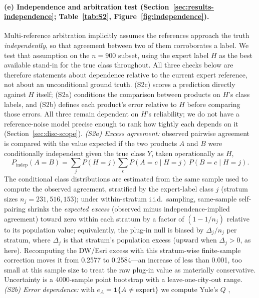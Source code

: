 \documentclass[remotesensing,article,submit,moreauthors]{Definitions/mdpi}
\begin{document}
\paragraph{(e) Independence and arbitration test (Section~\ref{sec:results-independence};
Table~\ref{tab:S2}, Figure~\ref{fig:independence}).}
Multi-reference arbitration implicitly assumes the references approach the truth
\emph{independently}, so that agreement between two of them corroborates a
label. We test that assumption on the $n = 900$ subset, using the expert label
$H$ as the best available stand-in for the true class throughout. All three
checks below are therefore statements about dependence relative to the current
expert reference, not about an unconditional ground truth. (S2c) scores a
prediction directly against $H$ itself; (S2a) conditions the comparison
between products on $H$'s class labels, and (S2b) defines each product's
error relative to $H$ before comparing those errors. All three remain
dependent on $H$'s reliability; we do not have a reference-noise model
precise enough to rank how tightly each depends on it
(Section~\ref{sec:disc-scope}).
\emph{(S2a) Excess agreement:} observed pairwise agreement is compared with the
value expected if the two products $A$ and $B$ were conditionally independent
given the true class $Y$, taken operationally as $H$,
%
\begin{equation}\label{eq:condindep}
P_{\text{indep}}(A = B) = \sum_{j} P(H = j) \sum_{c} P(A = c \mid H = j)\,P(B = c \mid H = j).
\end{equation}
%
The conditional class distributions are estimated from the same sample used to
compute the observed agreement, stratified by the expert-label class $j$
(stratum sizes $n_j = 231, 516, 153$); under within-stratum i.i.d.\ sampling,
same-sample self-pairing shrinks the \emph{expected excess} (observed minus
independence-implied agreement) toward zero within each stratum by a factor
of $(1-1/n_j)$ relative to its population value; equivalently, the plug-in
null is biased by $\Delta_j/n_j$ per stratum, where $\Delta_j$ is that
stratum's population excess (upward when $\Delta_j > 0$, as here). Recomputing the DW/Esri
excess with this stratum-wise finite-sample correction moves it from 0.2577
to 0.2584---an increase of less than 0.001, too small at this sample size to treat the
raw plug-in value as materially conservative. Uncertainty is a 4000-sample point bootstrap with a
leave-one-city-out range. \emph{(S2b) Error dependence:} with $e_{A} =
\mathbf{1}\{A \neq \text{expert}\}$ we compute Yule's $Q$ \citep{yule1900},
\end{document}
